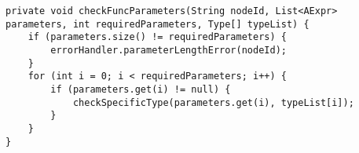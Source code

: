 \begin{lstlisting}[caption={Private helper method for verifying predefined function parameters in FuncStructureVisitor}, label={checkFuncParameters}]
private void checkFuncParameters(String nodeId, List<AExpr> parameters, int requiredParameters, Type[] typeList) {
    if (parameters.size() != requiredParameters) {
        errorHandler.parameterLengthError(nodeId);
    }
    for (int i = 0; i < requiredParameters; i++) {
        if (parameters.get(i) != null) {
            checkSpecificType(parameters.get(i), typeList[i]);
        }
    }
}
\end{lstlisting}